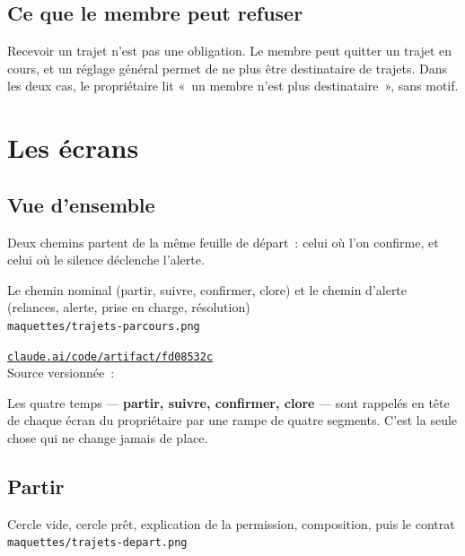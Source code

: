 \section{Ce que le membre peut refuser}

Recevoir un trajet n'est pas une obligation. Le membre peut quitter un trajet en cours, et
un réglage général permet de ne plus être destinataire de trajets. Dans les deux cas, le
propriétaire lit «~un membre n'est plus destinataire~», sans motif.

\chapter{Les écrans}

\section{Vue d'ensemble}

Deux chemins partent de la même feuille de départ~: celui où l'on confirme, et celui où le
silence déclenche l'alerte.

\begin{center}
    {Le chemin nominal (partir, suivre, confirmer, clore) et le chemin d'alerte
     (relances, alerte, prise en charge, résolution)\\
     \texttt{maquettes/trajets-parcours.png}}
\end{center}

\begin{note}
\href{https://claude.ai/code/artifact/fd08532c-8cdb-454d-9af7-8c14a43b79b3}%
{\texttt{claude.ai/code/artifact/fd08532c}}\\
Source versionnée~: 
\end{note}

Les quatre temps --- \textbf{partir, suivre, confirmer, clore} --- sont rappelés en tête de
chaque écran du propriétaire par une rampe de quatre segments. C'est la seule chose qui ne
change jamais de place.

\section{Partir}

\begin{center}
    {Cercle vide, cercle prêt, explication de la permission, composition, puis le contrat\\
     \texttt{maquettes/trajets-depart.png}}
\end{center}

